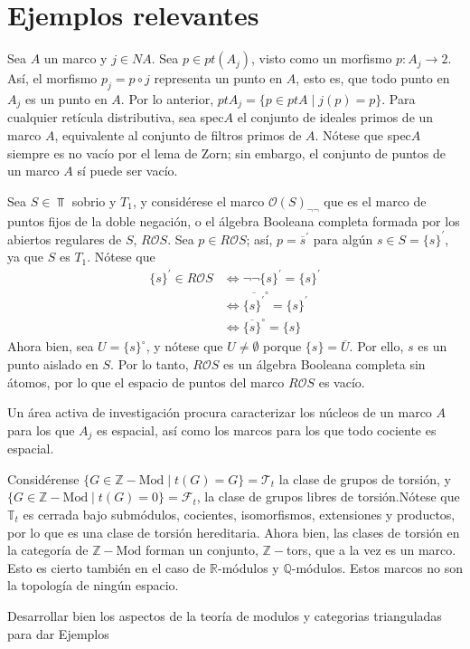 \chapter{Ejemplos relevantes}
Sea $A$ un marco y $j\in NA$. Sea $p\in pt(A_j)$, visto como un morfismo $p:A_j\to 2$. Así, el morfismo $p_j=p\circ j$ representa un punto en $A$, esto es, que todo punto en $A_j$ es un punto en $A$. Por lo anterior, $ptA_j=\{p\in ptA \mid j(p)=p\}$.
 Para cualquier retícula distributiva, sea spec$A$ el conjunto de ideales primos de un marco $A$, equivalente al conjunto de filtros primos de $A$. Nótese que spec$A$ siempre es no vacío por el lema de Zorn; sin embargo, el conjunto de puntos de un marco $A$ sí puede ser vacío.
 
 \begin{example}
     Sea $S\in \Top$ sobrio y $T_1$, y considérese el marco $\mathcal{O}(S)_{\neg \neg}$ que es el marco de puntos fijos de la doble negación, o el álgebra Booleana completa formada por los abiertos regulares de $S$, $R\mathcal{O}S$.
     Sea $p\in R\mathcal{O}S$; así, $p=\overline{s}^{\prime}$ para algún $s\in S=\{s\}^{\prime}$, ya que $S$ es $T_1$. Nótese que \begin{align*}
         \{s\}^{\prime}\in R\mathcal{O}S&\iff \neg\neg \{s\}^\prime =\{s\}^\prime\\
         &\iff \overline{\{s\}^\prime}^\circ=\{s\}^\prime\\
         &\iff \overline{\{s\}}^\circ=\{s\}
     \end{align*}
Ahora bien, sea $U=\{s\}^\circ$, y nótese que $U\neq\emptyset$ porque $\{s\}=\overline{U}$. Por ello, $s$ es un punto aislado en $S$.  Por lo tanto, $R\mathcal{O}S$ es un álgebra Booleana completa sin átomos, por lo que el espacio de puntos del marco $R\mathcal{O}S$ es vacío.
 \end{example}
 Un área activa de investigación procura caracterizar los núcleos de un marco $A$ para los que $A_j$ es espacial, así como los marcos para los que todo cociente es espacial.
 
 \begin{example}
 Considérense $\{G\in \mathbb{Z}-\text{Mod} \mid t(G)=G\}=\mathscr{T}_t$ la clase de grupos de torsión, y $\{G\in\mathbb{Z}-\text{Mod}\mid t(G)=0\}=\mathscr{F}_t$, la clase de grupos libres de torsión.Nótese que $\mathbb{T}_t$ es cerrada bajo submódulos, cocientes, isomorfismos, extensiones y productos, por lo que es una clase de torsión hereditaria.
 Ahora bien, las clases de torsión en la categoría de $\mathbb{Z}-\text{Mod}$ forman un conjunto, $\mathbb{Z}-$tors, que a la vez es un marco. Esto es cierto también en el caso de $\mathbb{R}$-módulos y $\mathbb{Q}$-módulos.
 Estos marcos no son la topología de ningún espacio.
 \end{example}

Desarrollar bien los aspectos de la teoría de modulos y categorias trianguladas para dar Ejemplos
